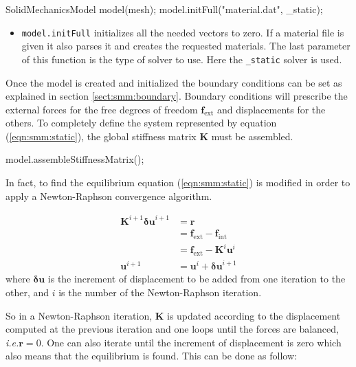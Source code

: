 \documentclass[a4paper,11pt]{book}
\newcommand{\code}[1]{\texttt{#1}}
\renewcommand{\vec}[1]{\ensuremath{\boldsymbol{#1}}}
\newcommand{\mat}[1]{\ensuremath{\boldsymbol{#1}}}
\newcommand{\st}[1]{{\mathrm{#1}}}
\newcommand{\ie}{\emph{i.e.}\xspace}
\begin{document}
\begin{cpp}
  SolidMechanicsModel model(mesh);
  model.initFull("material.dat", _static);
\end{cpp}


\begin{itemize}
\item \code{model.initFull}  initializes all the  needed vectors to zero.   If a
  material file is given it also  parses it and creates the requested materials.
  The last  parameter of this function  is the type  of solver to use.  Here the
  \code{\_static} solver is used.
\end{itemize}


Once the model is created and  initialized the boundary conditions can be set as
explained   in  section   \ref{sect:smm:boundary}.   Boundary   conditions  will
prescribe   the   external   forces    for   the   free   degrees   of   freedom
$\vec{f_{\st{ext}}}$ and displacements for the others.  To completely define the
system  represented  by equation  (\ref{eqn:smm:static}),  the global  stiffness
matrix            $\mat{K}$             must            be            assembled.

\begin{cpp}
  model.assembleStiffnessMatrix();
\end{cpp}

In fact, to find the  equilibrium equation (\ref{eqn:smm:static}) is modified in
order to apply a Newton-Raphson convergence algorithm.

\begin{align}\label{eqn:smm:static-newton-raphson}
  \mat{K}^{i+1} \vec{\delta u}^{i+1} &= \vec{r} \\
  &= \vec{f_{\st{ext}}} - \vec{f_{\st{int}}}\\
  &= \vec{f_{\st{ext}}} - \mat{K}^{i} \vec{u}^{i}\\
  \vec{u}^{i+1} &= \vec{u}^{i} + \vec{\delta u}^{i+1}\nonumber
\end{align}
where $\vec{\delta  u}$ is the  increment of displacement  to be added  from one
iteration to the other, and $i$ is the number of the Newton-Raphson iteration.

So  in  a  Newton-Raphson  iteration,  $\mat{K}$ is  updated  according  to  the
displacement computed at  the previous iteration and one  loops until the forces
are balanced, \ie $\vec{r} = 0$.  One can also iterate until the increment of
displacement is zero which also means that the equilibrium is found. This can be
done as follow:
\end{document}
